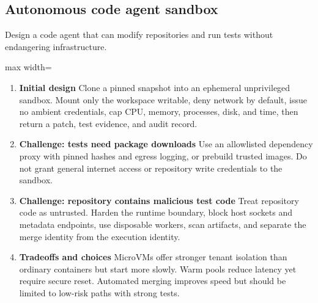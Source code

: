 \subsection{Autonomous code agent sandbox}
Design a code agent that can modify repositories and run tests without endangering infrastructure.
\begin{center}\begin{adjustbox}{max width=\linewidth}\end{adjustbox}\end{center}
\begin{enumerate}
\item \textbf{Initial design} Clone a pinned snapshot into an ephemeral unprivileged sandbox. Mount only the workspace writable, deny network by default, issue no ambient credentials, cap CPU, memory, processes, disk, and time, then return a patch, test evidence, and audit record.
\item \textbf{Challenge: tests need package downloads} Use an allowlisted dependency proxy with pinned hashes and egress logging, or prebuild trusted images. Do not grant general internet access or repository write credentials to the sandbox.
\item \textbf{Challenge: repository contains malicious test code} Treat repository code as untrusted. Harden the runtime boundary, block host sockets and metadata endpoints, use disposable workers, scan artifacts, and separate the merge identity from the execution identity.
\item \textbf{Tradeoffs and choices} MicroVMs offer stronger tenant isolation than ordinary containers but start more slowly. Warm pools reduce latency yet require secure reset. Automated merging improves speed but should be limited to low-risk paths with strong tests.
\end{enumerate}
